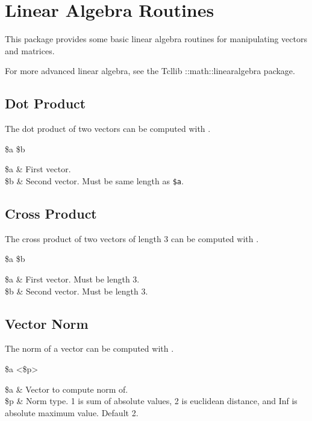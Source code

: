 \documentclass{article}
\begin{document}
\clearpage

\section{Linear Algebra Routines}
This package provides some basic linear algebra routines for manipulating vectors and matrices. 

For more advanced linear algebra, see the Tcllib ::math::linearalgebra package.

\subsection{Dot Product}
The dot product of two vectors can be computed with .
\begin{syntax}
 \$a \$b
\end{syntax}
\begin{args}
\$a & First vector. \\
\$b & Second vector. Must be same length as \texttt{\$a}.
\end{args}

\subsection{Cross Product}
The cross product of two vectors of length 3 can be computed with . 
\begin{syntax}
 \$a \$b
\end{syntax}
\begin{args}
\$a & First vector. Must be length 3.\\
\$b & Second vector. Must be length 3.
\end{args}

\subsection{Vector Norm}
The norm of a vector can be computed with .
\begin{syntax}
 \$a <\$p>
\end{syntax}
\begin{args}
\$a & Vector to compute norm of. \\
\$p & Norm type. 1 is sum of absolute values, 2 is euclidean distance, and Inf is absolute maximum value. Default 2.
\end{args}
\end{document}
